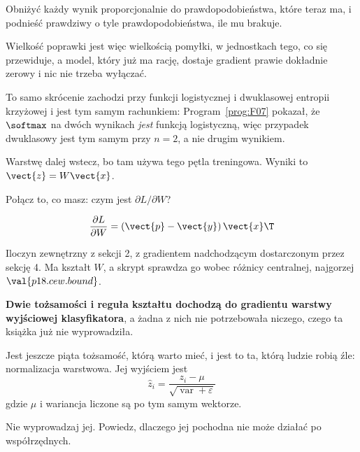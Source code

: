 \begin{fr}
\begin{ansblock}
Obniżyć każdy wynik proporcjonalnie do prawdopodobieństwa, które teraz ma, i
podnieść prawdziwy o tyle prawdopodobieństwa, ile mu brakuje.
\end{ansblock}

Wielkość poprawki jest więc wielkością pomyłki, w jednostkach tego, co się
przewiduje, a model, który już ma rację, dostaje gradient prawie dokładnie
zerowy i nic nie trzeba wyłączać.

\begin{note}
To samo skrócenie zachodzi przy funkcji logistycznej i dwuklasowej entropii
krzyżowej i jest tym samym rachunkiem: Program~\ref{prog:F07} pokazał, że
$\softmax$ na dwóch wynikach \emph{jest} funkcją logistyczną, więc przypadek
dwuklasowy jest tym samym przy $n = 2$, a nie drugim wynikiem.
\end{note}
\end{fr}

\begin{fr}
Warstwę dalej wstecz, bo tam używa tego pętla treningowa. Wyniki to
$\vect{z} = W\vect{x}$.

Połącz to, co masz: czym jest $\partial L/\partial W$?
\nextframe
\end{fr}

\begin{fr}
\begin{ansblock}
\[ \frac{\partial L}{\partial W} = (\vect{p} - \vect{y})\,\vect{x}\T \]
\end{ansblock}

Iloczyn zewnętrzny z sekcji 2, z gradientem nadchodzącym dostarczonym przez
sekcję 4. Ma kształt $W$, a skrypt sprawdza go wobec różnicy centralnej,
najgorzej $\val{p18.cew.bound}$.

\textbf{Dwie tożsamości i reguła kształtu dochodzą do gradientu warstwy
wyjściowej klasyfikatora}, a żadna z nich nie potrzebowała niczego, czego ta
książka już nie wyprowadziła.
\end{fr}

\begin{fr}
Jest jeszcze piąta tożsamość, którą warto mieć, i jest to ta, którą ludzie
robią źle: normalizacja warstwowa. Jej wyjściem jest
\[ \hat{z}_i = \frac{z_i - \mu}{\sqrt{\operatorname{var} + \varepsilon}} \]
gdzie $\mu$ i wariancja liczone są po tym samym wektorze.

Nie wyprowadzaj jej. Powiedz, dlaczego jej pochodna nie może działać po
współrzędnych.
\dotline
\nextframe
\end{fr}

